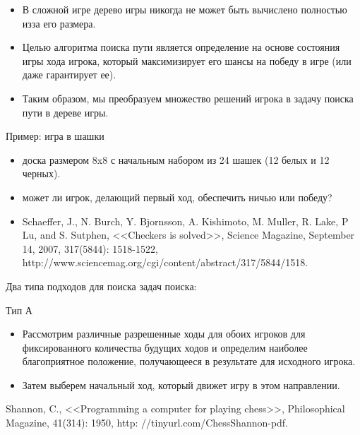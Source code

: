 \documentclass{beamer}
\begin{document}
\begin{frame}
\begin{itemize}
\item В сложной игре дерево игры никогда не может быть вычислено полностью изза его размера. \item Целью алгоритма поиска пути является определение на основе состояния игры хода игрока, который максимизирует его шансы на победу в игре (или даже гарантирует ее). 
\item Таким образом, мы преобразуем множество решений игрока в задачу поиска пути в дереве игры.
\end{itemize}
Пример: игра в шашки
\begin{itemize}
\item доска размером 8x8 с начальным набором из 24 шашек (12 белых и 12 черных).
\item может ли игрок, делающий первый ход, обеспечить ничью или победу?
\item Schaeffer, J., N. Burch, Y. Bjornsson, A. Kishimoto, M. Muller, R. Lake, P Lu, and S. Sutphen, <<Checkers is solved>>, Science Magazine, September 14, 2007, 317(5844): 1518-1522,
http://www.sciencemag.org/cgi/content/abstract/317/5844/1518.
\end{itemize}
\end{frame}

\begin{frame}
Два типа подходов для поиска задач поиска: 
\begin{block}{Тип А}
\begin{itemize}
\item Рассмотрим различные разрешенные ходы для обоих игроков для фиксированного количества будущих ходов и определим наиболее благоприятное положение, получающееся в результате для исходного игрока. 
\item Затем выберем начальный ход, который движет игру в этом направлении.
\end{itemize}
\end{block}
Shannon, C., <<Programming a computer for playing chess>>, Philosophical Magazine,
41(314): 1950, http: //tinyurl.com/ChessShannon-pdf.
\end{frame}
\end{document}

